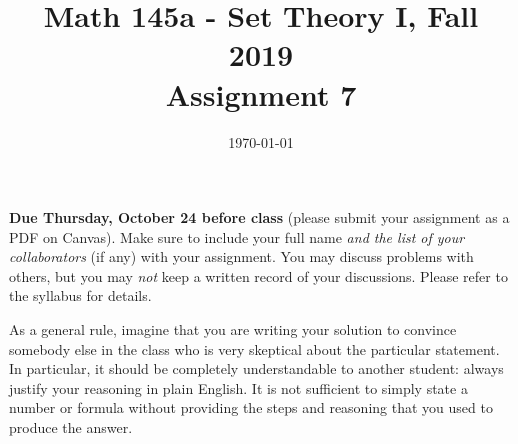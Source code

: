 \documentclass{amsart}
\title[Math 145a, Fall 2019: assignment 7]{Math 145a - Set Theory I, Fall 2019 \\ Assignment 7}
\date{\today}
\theoremstyle{definition}
\begin{document}

\vspace*{-10em}

\maketitle

\textbf{Due Thursday, October 24 before class} (please submit your assignment as a PDF on Canvas). Make sure to include your full name \emph{and the list of your collaborators} (if any) with your assignment. You may discuss problems with others, but you may \emph{not} keep a written record of your discussions. Please refer to the syllabus for details.

As a general rule, imagine that you are writing your solution to convince somebody else in the class who is very skeptical about the particular statement. In particular, it should be completely understandable to another student: always justify your reasoning in plain English. It is not sufficient to simply state a number or formula without providing the steps and reasoning that you used to produce the answer.
\end{document}
